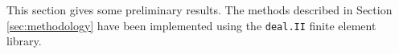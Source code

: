 This section gives some preliminary results. The methods described
in Section \ref{sec:methodology} have been implemented using the
\texttt{deal.II} finite element library\cite{dealii}.
